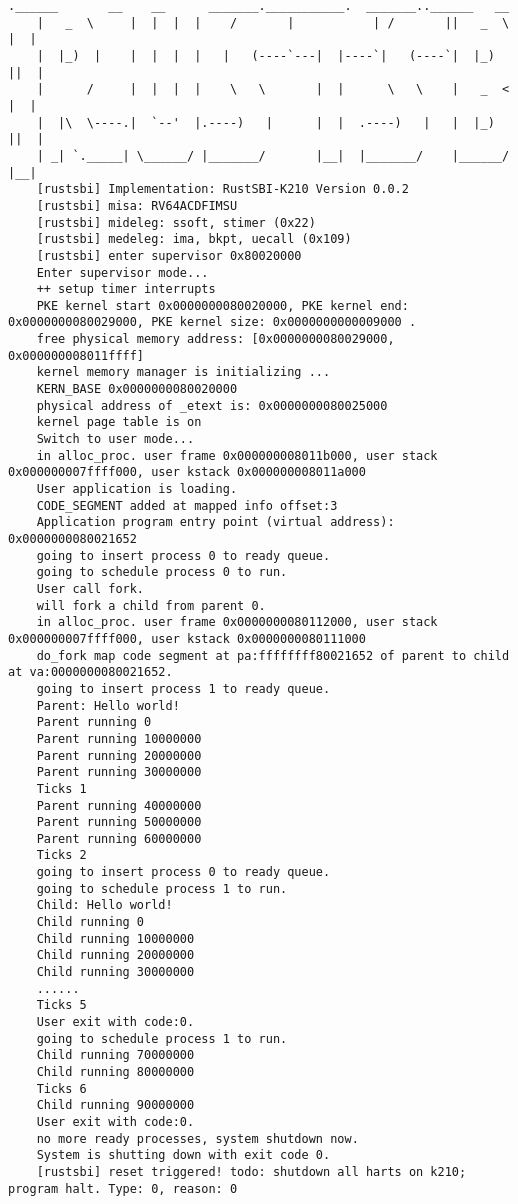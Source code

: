 \begin{lstlisting}[caption={lab9实验结果（移植K210后）}]
    .______       __    __      _______.___________.  _______..______   __
    |   _  \     |  |  |  |    /       |           | /       ||   _  \ |  |
    |  |_)  |    |  |  |  |   |   (----`---|  |----`|   (----`|  |_)  ||  |
    |      /     |  |  |  |    \   \       |  |      \   \    |   _  < |  |
    |  |\  \----.|  `--'  |.----)   |      |  |  .----)   |   |  |_)  ||  |
    | _| `._____| \______/ |_______/       |__|  |_______/    |______/ |__|
    [rustsbi] Implementation: RustSBI-K210 Version 0.0.2
    [rustsbi] misa: RV64ACDFIMSU
    [rustsbi] mideleg: ssoft, stimer (0x22)
    [rustsbi] medeleg: ima, bkpt, uecall (0x109)
    [rustsbi] enter supervisor 0x80020000
    Enter supervisor mode...
    ++ setup timer interrupts
    PKE kernel start 0x0000000080020000, PKE kernel end: 0x0000000080029000, PKE kernel size: 0x0000000000009000 .
    free physical memory address: [0x0000000080029000, 0x000000008011ffff]
    kernel memory manager is initializing ...
    KERN_BASE 0x0000000080020000
    physical address of _etext is: 0x0000000080025000
    kernel page table is on
    Switch to user mode...
    in alloc_proc. user frame 0x000000008011b000, user stack 0x000000007ffff000, user kstack 0x000000008011a000
    User application is loading.
    CODE_SEGMENT added at mapped info offset:3
    Application program entry point (virtual address): 0x0000000080021652
    going to insert process 0 to ready queue.
    going to schedule process 0 to run.
    User call fork.
    will fork a child from parent 0.
    in alloc_proc. user frame 0x0000000080112000, user stack 0x000000007ffff000, user kstack 0x0000000080111000
    do_fork map code segment at pa:ffffffff80021652 of parent to child at va:0000000080021652.
    going to insert process 1 to ready queue.
    Parent: Hello world!
    Parent running 0
    Parent running 10000000
    Parent running 20000000
    Parent running 30000000
    Ticks 1
    Parent running 40000000
    Parent running 50000000
    Parent running 60000000
    Ticks 2
    going to insert process 0 to ready queue.
    going to schedule process 1 to run.
    Child: Hello world!
    Child running 0
    Child running 10000000
    Child running 20000000
    Child running 30000000
    ......
    Ticks 5
    User exit with code:0.
    going to schedule process 1 to run.
    Child running 70000000
    Child running 80000000
    Ticks 6
    Child running 90000000
    User exit with code:0.
    no more ready processes, system shutdown now.
    System is shutting down with exit code 0.
    [rustsbi] reset triggered! todo: shutdown all harts on k210; program halt. Type: 0, reason: 0    
\end{lstlisting}

